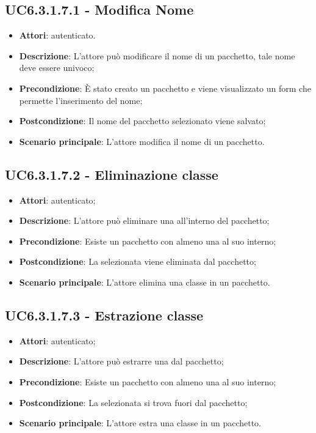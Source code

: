 \subsection{UC6.3.1.7.1 - Modifica Nome}
\label{ssec:UC6.3.1.7.1}
\begin{itemize}
\item \textbf{Attori}:  autenticato.
\item \textbf{Descrizione}: L'attore può modificare il nome di un pacchetto, tale nome deve essere univoco;
\item \textbf{Precondizione}: È stato creato un pacchetto e viene visualizzato un form che permette l'inserimento del nome;
\item \textbf{Postcondizione}: Il nome del pacchetto selezionato viene salvato;
\item \textbf{Scenario principale}: L'attore modifica il nome di un pacchetto.
\end{itemize}
\subsection{UC6.3.1.7.2 - Eliminazione classe}
\label{ssec:UC6.3.1.7.2}
\begin{itemize}
\item \textbf{Attori}:  autenticato;
\item \textbf{Descrizione}: L'attore può eliminare una  all'interno del pacchetto;
\item \textbf{Precondizione}: Esiste un pacchetto con almeno una  al suo interno;
\item \textbf{Postcondizione}: La  selezionata viene eliminata dal pacchetto;
\item \textbf{Scenario principale}: L'attore elimina una classe in un pacchetto.
\end{itemize}
\subsection{UC6.3.1.7.3 - Estrazione classe}
\label{ssec:UC6.3.1.7.3}
\begin{itemize}
\item \textbf{Attori}:  autenticato;
\item \textbf{Descrizione}: L'attore può estrarre una  dal pacchetto;
\item \textbf{Precondizione}: Esiste un pacchetto con almeno una  al suo interno;
\item \textbf{Postcondizione}: La  selezionata si trova fuori dal pacchetto;
\item \textbf{Scenario principale}: L'attore estra una classe in un pacchetto.
\end{itemize}

